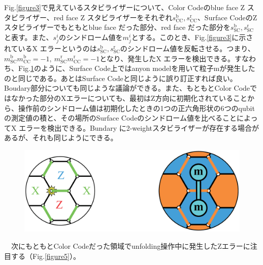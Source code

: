 \documentclass[a4paper,9pt]{ltjsarticle}
\begin{document}
{    Fig.\ref{figure3}で見えているスタビライザーについて、Color Codeのblue face Z スタビライザー、red face Z スタビライザーをそれぞれ$s^\text{b}_\text{CC}, s^\text{r}_\text{CC}$、Surface CodeのZ スタビライザーでもともとblue face だった部分、red face だった部分を$s^\text{b}_\text{SC}, s^\text{r}_\text{SC}$と表す。また、$s^i_j$のシンドローム値を$m^i_j$とする。このとき、Fig.\ref{figure3}に示されているX エラーというのは$s^\text{b}_\text{SC}, s^\text{r}_\text{SC}$のシンドローム値を反転させる。つまり、$m^\text{b}_\text{SC}m^\text{b}_\text{CC}=-1,\ m^\text{r}_\text{SC}m^\text{r}_\text{CC}=-1$となり、発生したX エラーを検出できる。すなわち、Fig.\ref{figure4}のように、Surface Code上ではanyon modelを用いて粒子mが発生したのと同じである。あとはSurface Codeと同じように誤り訂正すれば良い。Boudary部分についても同じような議論ができる。また、もともとColor Codeではなかった部分のXエラーについても、最初はZ方向に初期化されていることから、操作前のシンドローム値は初期化したときの1つの正六角形状の6つのqubitの測定値の積と、その場所のSurface Codeのシンドローム値を比べることによってX エラーを検出できる。Bundary に2-weightスタビライザーが存在する場合があるが、それも同じようにできる。

    \begin{figure}[h]
        \centering
        \includegraphics[scale=0.18]{figure/figure4.eps}
        \vspace{-20pt}\caption{ }
        \label{figure4}
    \end{figure}

    　次にもともとColor Codeだった領域でunfolding操作中に発生したZエラーに注目する（Fig.\ref{figure5}）。

}
\end{document}

